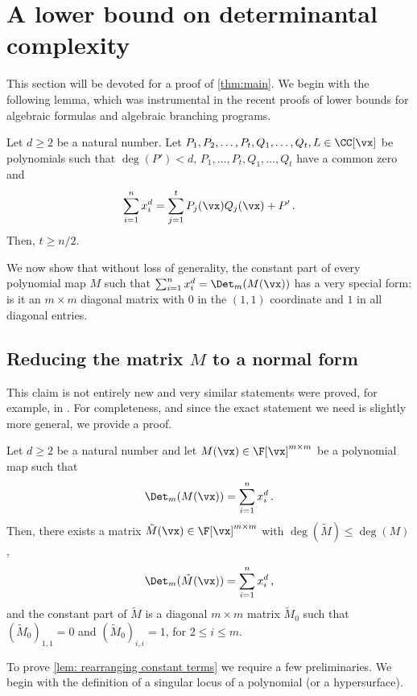 \section{A lower bound on determinantal complexity}\label{sec:main-lb}

This section will be devoted for a proof of \autoref{thm:main}. We begin with the following lemma, which was instrumental in the recent proofs of lower bounds for algebraic formulas and algebraic branching programs.

\begin{lemma}\label{lemma: width lb}
Let $d \ge 2$ be a natural number. Let $P_1, P_2, \ldots, P_t, Q_1, \ldots, Q_t, \allowbreak L \in \CC[\vx]$ be polynomials such that $\deg(P') < d$, $P_1, \ldots, P_t, Q_1, \ldots, Q_t$ have a common zero and 
\[
\sum_{i = 1}^n x_i^d = \sum_{j = 1}^t P_j(\vx)Q_j(\vx) + P' \, .
\]
Then, $t \geq n/2$. 
\end{lemma}


We now show that without loss of generality, the constant part of every polynomial map $M$ such that $\sum_{i=1}^n x_i^d = \Det_m(M(\vx))$ has a very special form: is it an $m \times m$ diagonal matrix with $0$ in the $(1,1)$ coordinate and $1$ in all diagonal entries.

\subsection{Reducing the matrix \texorpdfstring{$M$}{M} to a normal form}\label{sec: redn to normal form}

This claim is not entirely new and very similar statements were proved, for example, in \cite{MR04, ABV17}. For completeness, and since the exact statement we need is slightly more general, we provide a proof.

\begin{lemma}\label{lem: rearranging constant terms}
Let $d \ge 2$ be a natural number and let $M(\vx) \in \F[\vx]^{m \times m}$ be a polynomial map such that 
\[
\Det_m(M(\vx)) = \sum_{i = 1}^n x_i^d \, .
\]
Then, there exists a matrix $\tilde{M}(\vx)\in \F[\vx]^{m \times m}$ with $\deg(\tilde{M}) \leq \deg(M)$, 
\[
\Det_m(\tilde{M}(\vx)) = \sum_{i = 1}^n x_i^d \, ,
\]
and the constant part of $\tilde{M}$ is a diagonal $m \times m$ matrix $\tilde{M}_0$ such that $(\tilde{M}_0)_{1,1}=0$ and $(\tilde{M}_0)_{i,i}=1$, for $2 \le i \le m$.
\end{lemma}

To prove \autoref{lem: rearranging constant terms} we require a few preliminaries. We begin with the definition of a singular locus of a polynomial (or a hypersurface).

